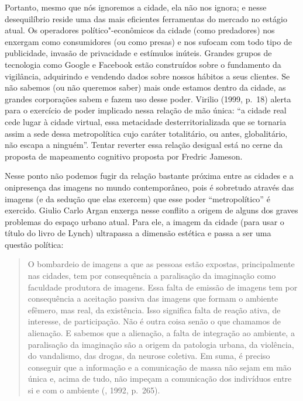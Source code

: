 Portanto, mesmo que nós ignoremos a cidade, ela não nos ignora; e nesse
desequilíbrio reside uma das mais eficientes ferramentas do mercado no
estágio atual. Os operadores político"-econômicos da cidade (como
predadores) nos enxergam como consumidores (ou como presas) e nos
sufocam com todo tipo de publicidade, invasão de privacidade e estímulos
inúteis. Grandes grupos de tecnologia como Google e Facebook estão
construídos sobre o fundamento da vigilância, adquirindo e vendendo
dados sobre nossos hábitos a seus clientes. Se não sabemos (ou não
queremos saber) mais onde estamos dentro da cidade, as grandes
corporações sabem e fazem uso desse poder. Virilio (1999, p.~18) alerta
para o exercício de poder implicado nessa relação de mão única: ``a
cidade real cede lugar à cidade virtual, essa metacidade
desterritorializada que se tornaria assim a sede dessa metropolítica
cujo caráter totalitário, ou antes, globalitário, não escapa a
ninguém''. Tentar reverter essa relação desigual está no cerne da
proposta de mapeamento cognitivo proposta por Fredric Jameson.

Nesse ponto não podemos fugir da relação bastante próxima entre as
cidades e a onipresença das imagens no mundo contemporâneo, pois é
sobretudo através das imagens (e da sedução que elas exercem) que esse
poder ``metropolítico'' é exercido. Giulio Carlo Argan enxerga nesse
conflito a origem de alguns dos graves problemas do espaço urbano atual.
Para ele, a imagem da cidade (para usar o título do livro de Lynch)
ultrapassa a dimensão estética e passa a ser uma questão política:

\begin{quote}
O bombardeio de imagens a que as pessoas estão expostas, principalmente
nas cidades, tem por consequência a paralisação da imaginação como
faculdade produtora de imagens. Essa falta de emissão de imagens tem por
consequência a aceitação passiva das imagens que formam o ambiente
efêmero, mas real, da existência. Isso significa falta de reação ativa,
de interesse, de participação. Não é outra coisa senão o que chamamos de
alienação. E sabemos que a alienação, a falta de integração ao ambiente,
a paralisação da imaginação são a origem da patologia urbana, da
violência, do vandalismo, das drogas, da neurose coletiva. Em suma, é
preciso conseguir que a informação e a comunicação de massa não sejam em
mão única e, acima de tudo, não impeçam a comunicação dos indivíduos
entre si e com o ambiente (, 1992, p.~265).
\end{quote}


